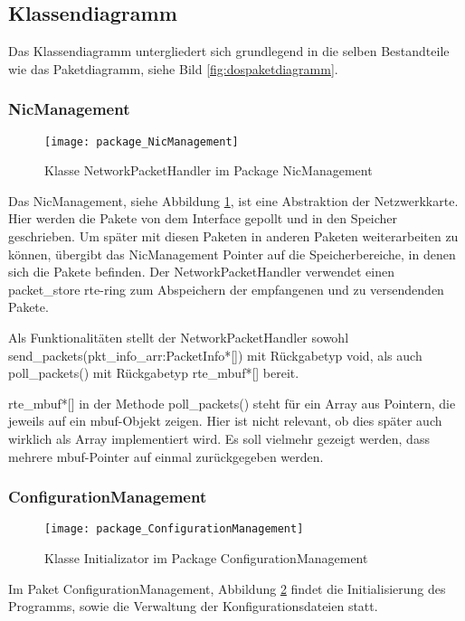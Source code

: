 \documentclass[../review_1.tex]{subfiles}
\begin{document}
\subsection{Klassendiagramm}

Das Klassendiagramm untergliedert sich grundlegend in die selben Bestandteile wie das Paketdiagramm, siehe Bild \ref{fig:dospaketdiagramm}.

\subsubsection{NicManagement}
\begin{figure} [t]
	\centering
	\texttt{[image: package\_NicManagement]}
	\caption{Klasse NetworkPacketHandler im Package NicManagement}
	\label{fig:NetworkPacketHandler}
\end{figure}
Das NicManagement, siehe Abbildung \ref{fig:NetworkPacketHandler}, ist eine Abstraktion der Netzwerkkarte. Hier werden die Pakete von dem Interface gepollt und in den Speicher geschrieben. Um später mit diesen Paketen in anderen Paketen weiterarbeiten zu können, übergibt das NicManagement Pointer auf die Speicherbereiche, in denen sich die Pakete befinden. Der NetworkPacketHandler verwendet einen packet\_store rte-ring zum Abspeichern der empfangenen und zu versendenden Pakete.

Als Funktionalitäten stellt der NetworkPacketHandler sowohl send\_packets(pkt\_info\_arr:PacketInfo*[]) mit Rückgabetyp void, als auch poll\_packets() mit Rückgabetyp rte\_mbuf*[] bereit.

rte\_mbuf*[] in der Methode poll\_packets() steht für ein Array aus Pointern, die jeweils auf ein mbuf-Objekt zeigen. Hier ist nicht relevant, ob dies später auch wirklich als Array implementiert wird. Es soll vielmehr gezeigt werden, dass mehrere mbuf-Pointer auf einmal zurückgegeben werden.
\subsubsection{ConfigurationManagement}
\begin{figure} [t]
	\centering
	\texttt{[image: package\_ConfigurationManagement]}
	\caption{Klasse Initializator im Package ConfigurationManagement}
	\label{fig:Initializator}
\end{figure}

Im Paket ConfigurationManagement, Abbildung \ref{fig:Initializator} findet die Initialisierung des Programms, sowie die Verwaltung der Konfigurationsdateien statt.
\end{document}
